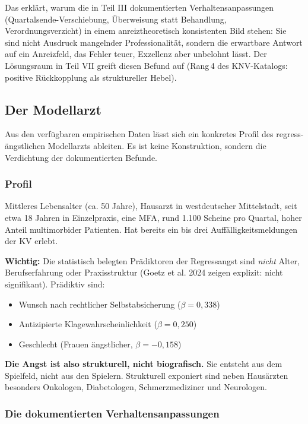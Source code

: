 \documentclass{umbruch-position}
\begin{document}
Das erklärt, warum die in Teil III dokumentierten Verhaltensanpassungen (Quartalsende-Verschiebung, Überweisung statt Behandlung, Verordnungsverzicht) in einem anreiztheoretisch konsistenten Bild stehen: Sie sind nicht Ausdruck mangelnder Professionalität, sondern die erwartbare Antwort auf ein Anreizfeld, das Fehler teuer, Exzellenz aber unbelohnt lässt. Der Lösungsraum in Teil VII greift diesen Befund auf (Rang\,4 des KNV-Katalogs: positive Rückkopplung als struktureller Hebel).

\subsection{Der Modellarzt}

Aus den verfügbaren empirischen Daten lässt sich ein konkretes Profil des regress-ängstlichen Modellarzts ableiten. Es ist keine Konstruktion, sondern die Verdichtung der dokumentierten Befunde.

\subsubsection{Profil}

Mittleres Lebensalter (ca. 50 Jahre), Hausarzt in westdeutscher Mittelstadt, seit etwa 18 Jahren in Einzelpraxis, eine MFA, rund 1.100 Scheine pro Quartal, hoher Anteil multimorbider Patienten. Hat bereits ein bis drei Auffälligkeitsmeldungen der KV erlebt.

\textbf{Wichtig:} Die statistisch belegten Prädiktoren der Regressangst sind \textit{nicht} Alter, Berufserfahrung oder Praxisstruktur (Goetz et al. 2024 zeigen explizit: nicht signifikant). Prädiktiv sind:
\begin{itemize}[nosep]
  \item Wunsch nach rechtlicher Selbstabsicherung ($\beta = 0{,}338$)
  \item Antizipierte Klagewahrscheinlichkeit ($\beta = 0{,}250$)
  \item Geschlecht (Frauen ängstlicher, $\beta = -0{,}158$)
\end{itemize}

\textbf{Die Angst ist also strukturell, nicht biografisch.} Sie entsteht aus dem Spielfeld, nicht aus den Spielern. Strukturell exponiert sind neben Hausärzten besonders Onkologen, Diabetologen, Schmerzmediziner und Neurologen.

\subsubsection{Die dokumentierten Verhaltensanpassungen}
\end{document}
